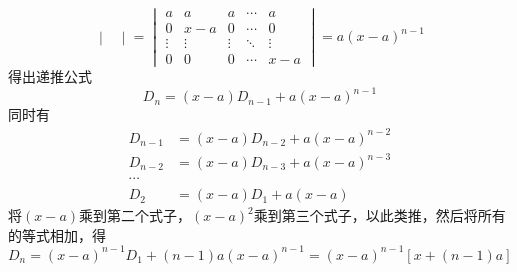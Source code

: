 \begin{solution}
\[\begin{vmatrix}
        \end{vmatrix}
        =
        \begin{vmatrix}
            a      & a      & a      & \cdots & a      \\
            0      & x - a  & 0      & \cdots & 0      \\
            \vdots & \vdots & \vdots & \ddots & \vdots \\
            0      & 0      & 0      & \cdots & x-a
        \end{vmatrix}
        =
        a(x-a)^{n-1}
    \]
    得出递推公式
    \[ D_n = (x-a)D_{n-1} + a(x-a)^{n-1} \]
    同时有
    \begin{align*}
        D_{n-1} & = (x-a)D_{n-2} + a(x-a)^{n-2} \\
        D_{n-2} & = (x-a)D_{n-3} + a(x-a)^{n-3} \\
        \cdots                                  \\
        D_2     & = (x-a)D_1 + a(x-a)
    \end{align*}
    将$(x-a)$乘到第二个式子，$(x-a)^2$乘到第三个式子，以此类推，然后将所有的等式相加，得
    \[ D_n = (x-a)^{n-1}D_1 + (n-1)a(x-a)^{n-1} = (x-a)^{n-1}[x +(n-1)a] \]
\end{solution}

